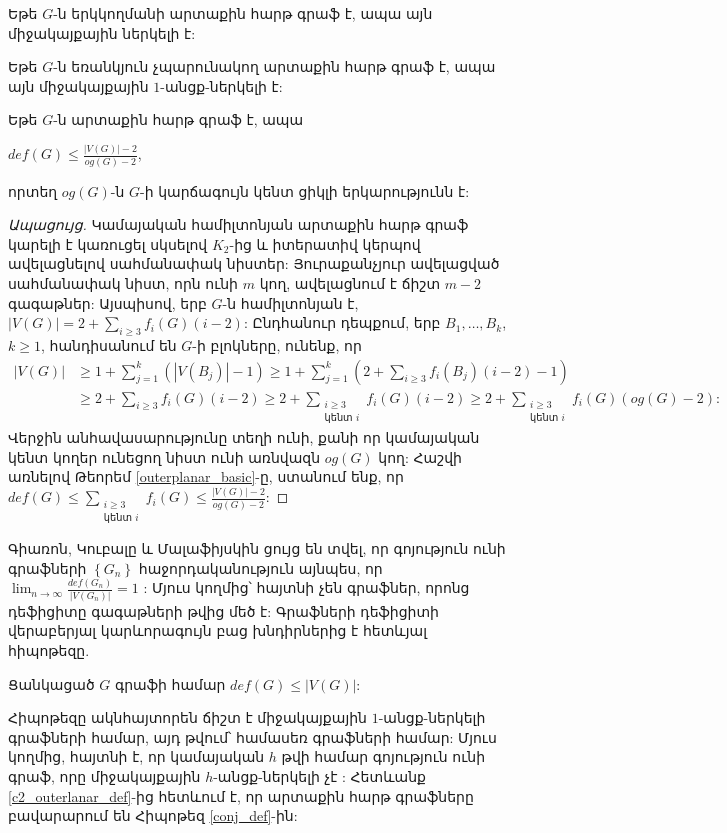 \begin{corollary}
Եթե $G$-ն երկկողմանի արտաքին հարթ գրաֆ է, ապա այն միջակայքային ներկելի է:
\end{corollary}

\begin{corollary}
Եթե $G$-ն եռանկյուն չպարունակող արտաքին հարթ գրաֆ է, ապա այն միջակայքային $1$-անցք-ներկելի է:
\end{corollary}

\begin{corollary}
\label{c2_outerlanar_def}
Եթե $G$-ն արտաքին հարթ գրաֆ է, ապա 
\begin{center}
$def(G) \leq \frac{|V(G)|-2}{og(G)-2}$,
\end{center}
որտեղ $og(G)$-ն $G$-ի կարճագույն կենտ ցիկլի երկարությունն է:
\end{corollary}
\begin{proof}[Ապացույց]
Կամայական համիլտոնյան արտաքին հարթ գրաֆ կարելի է կառուցել սկսելով $K_2$-ից և իտերատիվ կերպով ավելացնելով սահմանափակ նիստեր: Յուրաքանչյուր ավելացված սահմանափակ նիստ, որն ունի $m$ կող, ավելացնում է ճիշտ $m-2$ գագաթներ: Այսպիսով, երբ $G$-ն համիլտոնյան է, $|V(G)| = 2 + \sum\limits_{i\geq 3}f_i(G)(i-2)$: Ընդհանուր դեպքում, երբ $B_1, \ldots, B_k$, $k \geq 1$, հանդիսանում են $G$-ի բլոկները, ունենք, որ 
\begin{align*}
|V(G)| &\geq 1 + \sum\limits_{j=1}^{k}{\left(|V(B_j)|-1\right)} \geq 1 + \sum\limits_{j=1}^{k}{\left(2 + \sum\limits_{i\geq 3}f_i(B_j)(i-2) - 1\right)} \\
&\geq 2 + \sum\limits_{i\geq 3}f_i(G)(i-2) \geq 2 + \sum\limits_{\substack{i\geq 3\\\text{կենտ }i}}{f_i(G)(i-2)} \geq 2 + \sum\limits_{\substack{i\geq 3\\\text{կենտ }i}}{f_i(G)(og(G)-2)}:
\end{align*}
Վերջին անհավասարությունը տեղի ունի, քանի որ կամայական կենտ կողեր ունեցող նիստ ունի առնվազն $og(G)$ կող: Հաշվի առնելով Թեորեմ \ref{outerplanar_basic}-ը, ստանում ենք, որ
$def(G) \leq \sum\limits_{\substack{i\geq 3\\\text{կենտ }i}}{f_i(G)} \leq \frac{|V(G)| - 2}{og(G)-2}$:
\end{proof}

Գիառոն, Կուբալը և Մալաֆիյսկին ցույց են տվել, որ գոյություն ունի գրաֆների $\left\{G_n\right\}$ հաջորդականություն այնպես, որ $\lim_{n \rightarrow \infty}{\frac{def(G_n)}{|V(G_n)|}} = 1$ \cite{GiaroKubaleMalafiejski1999}: Մյուս կողմից՝ հայտնի չեն գրաֆներ, որոնց դեֆիցիտը գագաթների թվից մեծ է: Գրաֆների դեֆիցիտի վերաբերյալ կարևորագույն բաց խնդիրներից է հետևյալ հիպոթեզը.
\begin{hypothesis}
\label{conj_def}
Ցանկացած $G$ գրաֆի համար $def(G) \leq |V(G)|$:
\end{hypothesis}

Հիպոթեզը ակնհայտորեն ճիշտ է միջակայքային $1$-անցք-ներկելի գրաֆների համար, այդ թվում՝ համասեռ գրաֆների համար: Մյուս կողմից, հայտնի է, որ կամայական $h$ թվի համար գոյություն ունի գրաֆ, որը միջակայքային $h$-անցք-ներկելի չէ \cite{PetrosyanKhachatrianCID2013}: Հետևանք \ref{c2_outerlanar_def}-ից հետևում է, որ արտաքին հարթ գրաֆները բավարարում են Հիպոթեզ \ref{conj_def}-ին:
